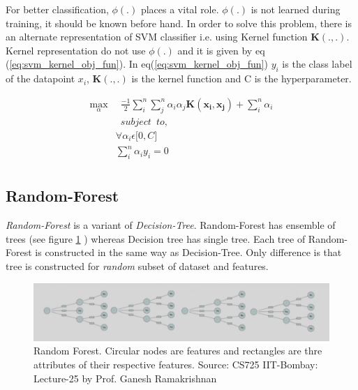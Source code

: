 \documentclass[twoside]{iitbreport}
\begin{document}
For better classification, $\phi(.)$  places a vital role. $\phi(.)$ is not learned during training, it should be known before hand. In order to solve this problem, there is an alternate representation of SVM classifier i.e. using Kernel function $\boldsymbol{K(.,.)}$. Kernel representation do not use $\phi(.)$ and it is given by eq (\ref{eq:svm_kernel_obj_fun}). In eq(\ref{eq:svm_kernel_obj_fun}) $y_i$ is the class label of the datapoint $x_i$, $\boldsymbol{K(.,.)}$ is the kernel function and C is the hyperparameter.

\begin{equation}\label{eq:svm_kernel_obj_fun}
  \begin{aligned}
     \max\limits_{\alpha} & \enspace \frac{-1}{2} \sum\limits_i^n \sum\limits_j^n \alpha_i \alpha_j \boldsymbol{K(x_i,x_j)}  + \sum\limits_i^n \alpha_i \\
     &\enspace  subject \enspace to,\\
     &\forall \alpha_i \epsilon \big[0,C]\\
     &\sum\limits_i^n \alpha_i y_i = 0\\
  \end{aligned}
\end{equation}

\subsection{Random-Forest}
\textit{Random-Forest} is a variant of \textit{Decision-Tree}. Random-Forest has ensemble of trees (see figure \ref{fig: Random-Forest} ) whereas Decision tree has single tree. Each tree of Random-Forest is constructed in the same way as Decision-Tree. Only difference is that tree is constructed for \textit{random} subset of dataset and features.

\begin{figure}[H]
\includegraphics[width=1\linewidth]{random-forest.png}
\centering
\captionsetup{justification=centering}
\caption{Random Forest. Circular nodes are features and rectangles are thre attributes of their respective features. Source: CS725 IIT-Bombay: Lecture-25 by Prof. Ganesh Ramakrishnan}
\label{fig: Random-Forest}
\end{figure}
\end{document}
